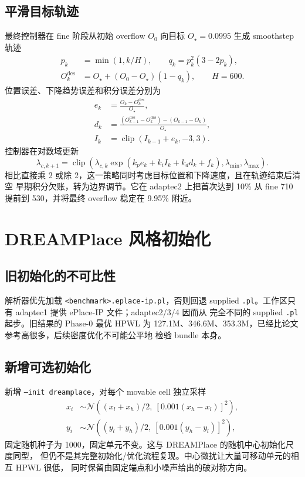\documentclass[UTF8,fontset=windows,a4paper,11pt]{ctexart}
\newcommand{\code}[1]{\texttt{#1}}
\begin{document}
\subsection{平滑目标轨迹}

最终控制器在 fine 阶段从初始 overflow $O_0$ 向目标 $O_\star=0.0995$ 生成
smoothstep 轨迹
\begin{align}
 p_k&=\min(1,k/H),\qquad q_k=p_k^2(3-2p_k),\\
 O_k^{\mathrm{des}}&=O_\star+(O_0-O_\star)(1-q_k),\qquad H=600.
\end{align}
位置误差、下降趋势误差和积分误差分别为
\begin{align}
 e_k&=\frac{O_k-O_k^{\mathrm{des}}}{O_\star},\\
 d_k&=\frac{(O_{k-1}^{\mathrm{des}}-O_k^{\mathrm{des}})
 -(O_{k-1}-O_k)}{O_\star},\\
 I_k&=\operatorname{clip}(I_{k-1}+e_k,-3,3).
\end{align}
控制器在对数域更新
\begin{equation}
 \lambda_{c,k+1}=\operatorname{clip}\left(
 \lambda_{c,k}\exp(k_p e_k+k_i I_k+k_d d_k+f_k),
 \lambda_{\min},\lambda_{\max}\right).
 \label{eq:lambda}
\end{equation}
相比直接乘 2 或除 2，这一策略同时考虑目标位置和下降速度，且在轨迹结束后清空
早期积分欠账，转为边界调节。它在 adaptec2 上把首次达到 10\% 从 fine 710
提前到 530，并将最终 overflow 稳定在 9.95\% 附近。

\section{DREAMPlace 风格初始化}

\subsection{旧初始化的不可比性}

解析器优先加载 \code{<benchmark>.eplace-ip.pl}，否则回退 supplied
\code{.pl}。工作区只有 adaptec1 提供 ePlace-IP 文件；adaptec2/3/4 因而从
完全不同的 supplied \code{.pl} 起步。旧结果的 Phase-0 最优 HPWL 为
127.1M、346.6M、353.3M，已经比论文参考高很多，后续密度优化不可能公平地
检验 bundle 本身。

\subsection{新增可选初始化}

新增 \code{--init dreamplace}，对每个 movable cell 独立采样
\begin{align}
 x_i&\sim\mathcal N\left((x_l+x_h)/2,\ [0.001(x_h-x_l)]^2\right),\\
 y_i&\sim\mathcal N\left((y_l+y_h)/2,\ [0.001(y_h-y_l)]^2\right),
\end{align}
固定随机种子为 1000，固定单元不变。这与 DREAMPlace 的随机中心初始化尺度同型，
但仍不是其完整初始化/优化流程复现。中心微扰让大量可移动单元的相互 HPWL 很低，
同时保留由固定端点和小噪声给出的破对称方向。
\end{document}
